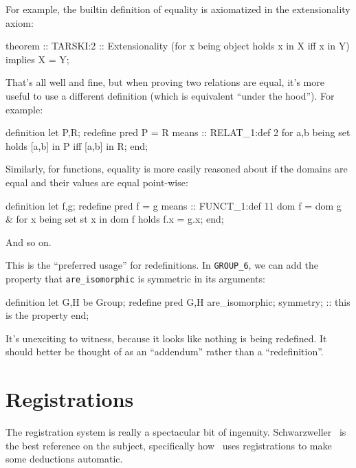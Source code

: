 \begin{node}[Redefinitions]
\begin{node}\label{mizar-001Q}%
For example, the builtin definition of equality is axiomatized in the
extensionality axiom:
\begin{mizar}
theorem :: TARSKI:2 :: Extensionality
  (for x being object holds x in X iff x in Y) implies X = Y;
\end{mizar}
That's all well and fine, but when proving two relations are equal, it's
more useful to use a different definition (which is equivalent ``under
the hood''). For example:
\begin{mizar}
definition
  let P,R;
  redefine pred P = R means
:: RELAT_1:def 2
  for a,b being set holds [a,b] in P iff [a,b] in R;
end;
\end{mizar}
Similarly, for functions, equality is more easily reasoned about if the
domains are equal and their values are equal point-wise:
\begin{mizar}
definition
  let f,g;
  redefine pred f = g means
:: FUNCT_1:def 11
  dom f = dom g
  & for x being set st x in dom f holds f.x = g.x;
end;
\end{mizar}
And so on.
\end{node}

\begin{node}\label{mizar-001R}%
This is the ``preferred usage'' for redefinitions. In \verb|GROUP_6|, we
can add the property that \verb|are_isomorphic| is symmetric in its
arguments:
\begin{mizar}
definition
  let G,H be Group;
  redefine pred G,H are_isomorphic;
  symmetry; :: this is the property
end;
\end{mizar}
It's unexciting to witness, because it looks like nothing is being
redefined. It should better be thought of as an ``addendum'' rather than
a ``redefinition''.
\end{node}
\end{node}

\section{Registrations}

\begin{node}\label{mizar-001U}%
The registration system is really a spectacular bit of ingenuity. 
Schwarzweller~\cite{schwarzweller2007mizar} is the best reference on the
subject, specifically how \Mizar\ uses registrations to make some
deductions automatic.
\end{node}

